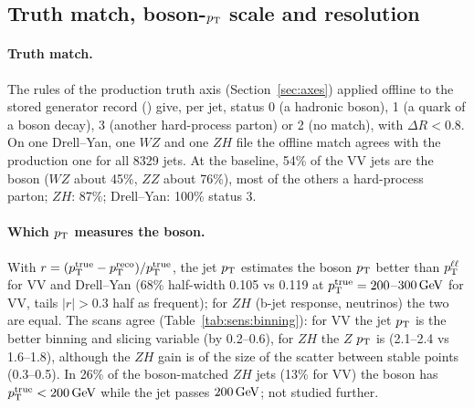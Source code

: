 \subsection{Truth match, boson-$p_{\mathrm{T}}$ scale and resolution}
\label{app:sens:truth}

\paragraph{Truth match.} The rules of the production truth axis (Section~\ref{sec:axes}) applied offline to the stored
generator record () give, per jet, status 0 (a hadronic boson), 1 (a quark of a boson decay), 3
(another hard-process parton) or 2 (no match), with $\Delta R < 0.8$. On one Drell--Yan, one $WZ$ and one $ZH$ file the
offline match agrees with the production one for all 8329 jets. At the baseline, 54\% of the VV jets are the boson
($WZ$ about 45\%, $ZZ$ about 76\%), most of the others a hard-process parton; $ZH$: 87\%; Drell--Yan: 100\% status 3.

\paragraph{Which $p_{\mathrm{T}}$ measures the boson.} With $r = (p_{\mathrm{T}}^\mathrm{true} - p_{\mathrm{T}}^\mathrm{reco})/p_{\mathrm{T}}^\mathrm{true}$, the jet
$p_{\mathrm{T}}$ estimates the boson $p_{\mathrm{T}}$ better than $p_{\mathrm{T}}^{\ell\ell}$ for VV and Drell--Yan (68\% half-width 0.105 vs 0.119 at
$p_{\mathrm{T}}^\mathrm{true} = 200$--$300\,\mathrm{GeV}$ for VV, tails $|r| > 0.3$ half as frequent); for $ZH$ (b-jet response, neutrinos)
the two are equal. The scans agree (Table~\ref{tab:sens:binning}): for VV the jet $p_{\mathrm{T}}$ is the better binning and slicing
variable (by 0.2--0.6), for $ZH$ the $Z$ $p_{\mathrm{T}}$ is (2.1--2.4 vs 1.6--1.8), although the $ZH$ gain is of the size of the
scatter between stable points (0.3--0.5). In 26\% of the boson-matched $ZH$ jets (13\% for VV) the boson has
$p_{\mathrm{T}}^\mathrm{true} < 200\,\mathrm{GeV}$ while the jet passes $200\,\mathrm{GeV}$; not studied further.

